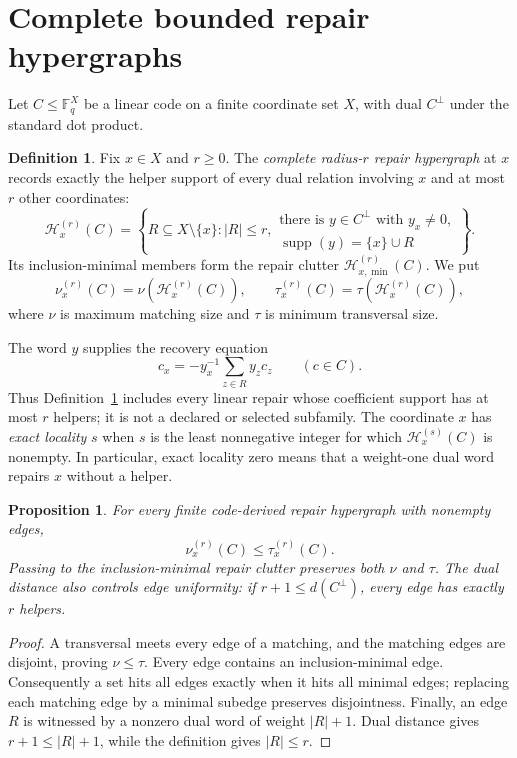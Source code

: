 \documentclass[11pt]{article}
\newtheorem{proposition}[theorem]{Proposition}
\theoremstyle{definition}
\newtheorem{definition}[theorem]{Definition}
\theoremstyle{remark}
\newcommand{\F}{\mathbb{F}}
\newcommand{\cH}{\mathcal{H}}
\newcommand{\supp}{\operatorname{supp}}
\begin{document}
\section{Complete bounded repair hypergraphs}
\label{sec:repair}

Let $C\leq\F_q^X$ be a linear code on a finite coordinate set $X$, with
dual $C^\perp$ under the standard dot product.

\begin{definition}\label{def:repair-hypergraph}
Fix $x\in X$ and $r\geq0$.  The \emph{complete radius-$r$ repair
hypergraph} at $x$ records exactly the helper support of every dual relation
involving $x$ and at most $r$ other coordinates:
\[
 \cH_x^{(r)}(C)=
 \left\{R\subseteq X\setminus\{x\}: |R|\leq r,
 \begin{array}{l}
 \text{there is }y\in C^\perp\text{ with }y_x\ne0,\\[-2mm]
 \supp(y)=\{x\}\cup R
 \end{array}\right\}.
\]
Its inclusion-minimal members form the repair clutter
$\cH_{x,\min}^{(r)}(C)$.  We put
\[
 \nu_x^{(r)}(C)=\nu(\cH_x^{(r)}(C)),\qquad
 \tau_x^{(r)}(C)=\tau(\cH_x^{(r)}(C)),
\]
where $\nu$ is maximum matching size and $\tau$ is minimum transversal size.
\end{definition}

The word $y$ supplies the recovery equation
\[
 c_x=-y_x^{-1}\sum_{z\in R}y_zc_z\qquad(c\in C).
\]
Thus Definition~\ref{def:repair-hypergraph} includes every linear repair
whose coefficient support has at most $r$ helpers; it is not a declared or
selected subfamily.
The coordinate $x$ has \emph{exact locality} $s$ when $s$ is the least
nonnegative integer for which $\cH_x^{(s)}(C)$ is nonempty.  In particular,
exact locality zero means that a weight-one dual word repairs $x$ without a
helper.

\begin{proposition}\label{prop:basic-hypergraph}
For every finite code-derived repair hypergraph with nonempty edges,
\[
 \nu_x^{(r)}(C)\leq\tau_x^{(r)}(C).
\]
Passing to the inclusion-minimal repair clutter preserves both $\nu$ and
$\tau$.  The dual distance also controls edge uniformity: if
$r+1\leq d(C^\perp)$, every edge has exactly $r$ helpers.
\end{proposition}

\begin{proof}
A transversal meets every edge of a matching, and the matching edges are
disjoint, proving $\nu\leq\tau$.  Every edge contains an inclusion-minimal
edge.  Consequently a set hits all edges exactly when it hits all minimal
edges; replacing each matching edge by a minimal subedge preserves
disjointness.  Finally, an edge $R$ is witnessed by a nonzero dual word of
weight $|R|+1$.  Dual distance gives $r+1\leq |R|+1$, while the definition
gives $|R|\leq r$.
\end{proof}
\end{document}
